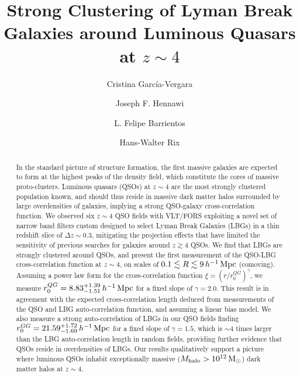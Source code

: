 \documentclass[iop, revtex4]{emulateapj}
\begin{document}
\title{Strong Clustering of Lyman Break Galaxies around Luminous Quasars at $z \sim 4$\footnotemark[1,2]}

\author{Cristina Garc\'ia-Vergara }
\author{Joseph F. Hennawi }
\author{L. Felipe Barrientos }
\author{Hans-Walter Rix }


\begin{abstract}
In the standard picture of structure formation, the first massive
galaxies are expected to form at the highest peaks of the density field, which constitute
the cores of massive proto-clusters.
Luminous quasars (QSOs) at $z\sim4$ are the most strongly clustered
population known, and should thus reside in massive dark matter halos
surrounded by large overdensities of galaxies, implying a strong
QSO-galaxy cross-correlation function. We observed six $z\sim4$ QSO fields
with VLT/FORS exploiting a novel set of narrow band filters
custom designed to select Lyman Break Galaxies (LBGs) in a thin redshift slice of
$\Delta z\sim0.3$, mitigating the projection effects that have limited the
sensitivity of previous searches for galaxies around $z\gtrsim4$ QSOs.  
We find that LBGs are strongly clustered around QSOs, and present 
the first measurement of the QSO-LBG
cross-correlation function at $z\sim4$, on scales of $0.1\lesssim R\lesssim9\,h^{-1}\,{\rm Mpc}$
 (comoving). Assuming a power law form for
the cross-correlation function $\xi=(r/r^{QG}_0)^\gamma$,
we measure $r^{QG}_{0}=8.83^{+1.39}_{-1.51}\,h^{-1}\,{\rm Mpc}$ for a fixed
slope of $\gamma=2.0$.
This result is in agreement with the expected cross-correlation length
deduced from measurements
of the QSO and LBG auto-correlation function, and assuming a linear bias model.
We also measure a strong auto-correlation of LBGs in our QSO fields finding
$r_{0}^{GG}=21.59^{+1.72}_{-1.69}\,h^{-1}\,{\rm Mpc}$ for a fixed
slope of $\gamma=1.5$, which is $\sim4$ times larger than the LBG
auto-correlation length in random fields, providing further evidence that
QSOs reside in overdensities of LBGs. Our results qualitatively
support a picture where luminous QSOs inhabit exceptionally massive ($M_{\rm
  halo}>10^{12}\,\rm M_{\odot}$) dark matter halos at $z\sim4$.
\end{abstract}
\end{document}
